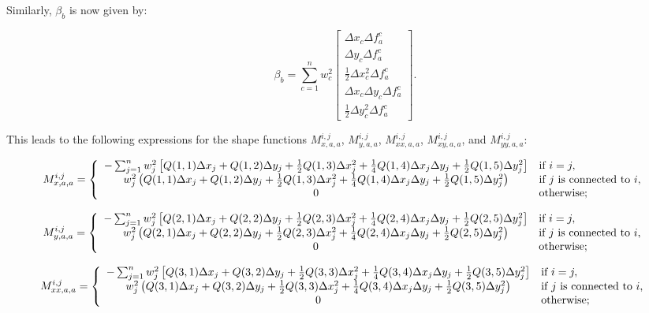 \documentclass{article}
\begin{document}
Similarly, $\beta_b$ is now given by:

\begin{equation} \label{eq:disc_LSbetab3}
\beta_b = \sum_{c=1}^n w_c^2
\begin{bmatrix}
\Delta x_c \Delta f_a^c \\ \Delta y_c \Delta f_a^c \\ \frac12 \Delta x_c^2 \Delta f_a^c \\ \Delta x_c \Delta y_c \Delta f_a^c \\ \frac12 \Delta y_c^2 \Delta f_a^c
\end{bmatrix}.
\end{equation}

This leads to the following expressions for the shape functions $M_{x,a,a}^{i,j}$, $M_{y,a,a}^{i,j}$, $M_{xx,a,a}^{i,j}$, $M_{xy,a,a}^{i,j}$, and $M_{yy,a,a}^{i,j}$:

\begin{equation}
M_{x,a,a}^{i,j} = \left\{
\begin{array}{ c l }
-\sum_{j=1}^n w_j^2 \left[ Q(1,1) \Delta x_j + Q(1,2) \Delta y_j + \frac12 Q(1,3) \Delta x_j^2 + \frac14 Q(1,4) \Delta x_j \Delta y_j + \frac12 Q(1,5) \Delta y_j^2 \right] & \textrm{if } i = j, \\
w_j^2 \left( Q(1,1) \Delta x_j + Q(1,2) \Delta y_j + \frac12 Q(1,3) \Delta x_j^2 + \frac14 Q(1,4) \Delta x_j \Delta y_j + \frac12 Q(1,5) \Delta y_j^2 \right) & \textrm{if } j \textrm{ is connected to } i, \\
0 & \textrm{otherwise};
\end{array}
\right.
\end{equation}

\begin{equation}
M_{y,a,a}^{i,j} = \left\{
\begin{array}{ c l }
-\sum_{j=1}^n w_j^2 \left[ Q(2,1) \Delta x_j + Q(2,2) \Delta y_j + \frac12 Q(2,3) \Delta x_j^2 + \frac14 Q(2,4) \Delta x_j \Delta y_j + \frac12 Q(2,5) \Delta y_j^2 \right] & \textrm{if } i = j, \\
w_j^2 \left( Q(2,1) \Delta x_j + Q(2,2) \Delta y_j + \frac12 Q(2,3) \Delta x_j^2 + \frac14 Q(2,4) \Delta x_j \Delta y_j + \frac12 Q(2,5) \Delta y_j^2 \right) & \textrm{if } j \textrm{ is connected to } i, \\
0 & \textrm{otherwise};
\end{array}
\right.
\end{equation}

\begin{equation}
M_{xx,a,a}^{i,j} = \left\{
\begin{array}{ c l }
-\sum_{j=1}^n w_j^2 \left[ Q(3,1) \Delta x_j + Q(3,2) \Delta y_j + \frac12 Q(3,3) \Delta x_j^2 + \frac14 Q(3,4) \Delta x_j \Delta y_j + \frac12 Q(3,5) \Delta y_j^2 \right] & \textrm{if } i = j, \\
w_j^2 \left( Q(3,1) \Delta x_j + Q(3,2) \Delta y_j + \frac12 Q(3,3) \Delta x_j^2 + \frac14 Q(3,4) \Delta x_j \Delta y_j + \frac12 Q(3,5) \Delta y_j^2 \right) & \textrm{if } j \textrm{ is connected to } i, \\
0 & \textrm{otherwise};
\end{array}
\right.
\end{equation}
\end{document}
